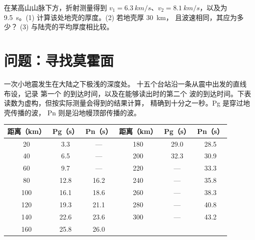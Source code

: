 \begin{exercise}[$\star\star\star$]\label{exo:g11:seismic-structure:15}
在某高山山脉下方，折射测量得到 $v_1 =
\qty{6.3}{km/s}$、$v_2 = \qty{8.1}{km/s}$，以及为
\qty{9.5}{s}。(1) 计算该处地壳的厚度。(2) 若地壳厚 \qty{30}{km}，
且波速相同，其应为多少？
(3) 与陆壳的平均厚度相比较。
\end{exercise}

\section{问题：寻找莫霍面}

\begin{problem}
\label{pb:g11:seismic-structure:1}
一次小地震发生在大陆之下极浅的深度处。
十五个台站沿一条从震中出发的直线布设，记录
第一个 的到达时间，以及在能够读出时的第二个
波的到达时间。下表读数为虚构，但按实际测量会得到的结果计算，
精确到十分之一秒。Pg 是穿过地壳传播的波，
Pn 则是沿地幔顶部传播的波。

\begin{center}
\small
\begin{tabular}{|c|c|c||c|c|c|}
\hline
距离（\unit{km}） & Pg（\unit{s}） & Pn（\unit{s}） & 距离（\unit{km}） & Pg（\unit{s}） & Pn（\unit{s}） \\ \hline
20 & 3.3 & --- & 180 & 29.0 & 28.5 \\ \hline
40 & 6.5 & --- & 200 & 32.3 & 30.9 \\ \hline
60 & 9.7 & --- & 220 & --- & 33.3 \\ \hline
80 & 12.8 & 16.2 & 240 & --- & 35.8 \\ \hline
100 & 16.1 & 18.6 & 260 & --- & 38.3 \\ \hline
120 & 19.3 & 21.1 & 280 & --- & 40.8 \\ \hline
140 & 22.6 & 23.6 & 300 & --- & 43.2 \\ \hline
160 & 25.8 & 26.0 & & & \\ \hline
\end{tabular}
\end{center}


\end{problem}
